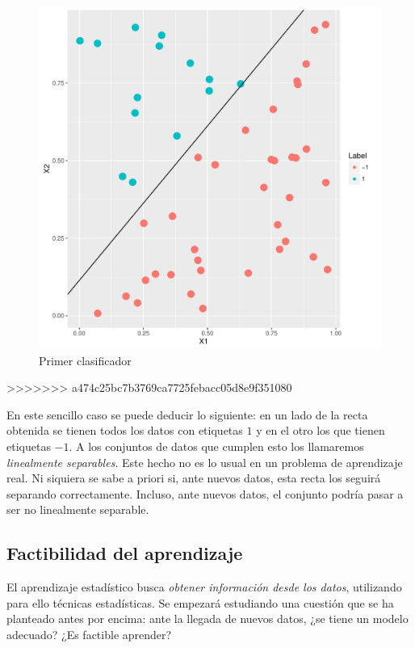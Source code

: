 \documentclass[a4paper,11pt]{book}\usepackage[]{graphicx}\usepackage[]{color}
\makeatletter
\def\maxwidth{ %
  \ifdim\Gin@nat@width>\linewidth
    \linewidth
  \else
    \Gin@nat@width
  \fi
}
\newenvironment{knitrout}{}{} %
\theoremstyle{plain}
\theoremstyle{definition}
\makeatother
\begin{document}
\begin{knitrout}
\color{fgcolor}\begin{figure}
\includegraphics[width=\maxwidth]{figure/classificationExample-1} \caption[Primer clasificador]{Primer clasificador}\label{fig:classificationExample}
\end{figure}
>>>>>>> a474c25bc7b3769ca7725febacc05d8e9f351080


\end{knitrout}

En este sencillo caso se puede deducir lo siguiente: en un lado de la recta obtenida
se tienen todos los datos con etiquetas $1$ y en el otro los que tienen etiquetas $-1$.
A los conjuntos de datos que cumplen esto los llamaremos \emph{linealmente separables}.
Este hecho no es lo usual en un problema de aprendizaje real. Ni siquiera se sabe
a priori si, ante nuevos datos, esta recta los seguirá separando correctamente.
Incluso, ante nuevos datos, el conjunto podría pasar a ser no linealmente separable.

\subsection{Factibilidad del aprendizaje}

El aprendizaje estadístico busca \emph{obtener información desde los datos},
utilizando para ello técnicas estadísticas. Se empezará estudiando una cuestión
que se ha planteado antes por encima: ante la llegada de nuevos datos, ¿se tiene
un modelo adecuado? ¿Es factible aprender?
\end{document}
